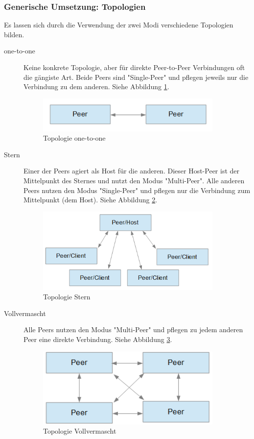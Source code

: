 \subsubsection{Generische Umsetzung: Topologien}
Es lassen sich durch die Verwendung der zwei Modi verschiedene Topologien bilden.
\begin{description}
\item[one-to-one]
Keine konkrete Topologie, aber für direkte Peer-to-Peer Verbindungen oft die gängiste Art. Beide Peers sind "Single-Peer" und pflegen jeweils nur die Verbindung zu dem anderen. 
Siehe Abbildung \ref{backfig3}.
\begin{figure}[ht]
\centering
\includegraphics[width=0.9\textwidth]{backend/Topologie_1v1.PNG}
\caption{Topologie one-to-one}
\label{backfig3}
\end{figure}

\item[Stern]
Einer der Peers agiert als Host für die anderen. Dieser Host-Peer ist der Mittelpunkt des Sternes und nutzt den Modus "Multi-Peer". Alle anderen Peers nutzen den Modus "Single-Peer" und pflegen nur die Verbindung zum Mittelpunkt (dem Host).
Siehe Abbildung \ref{backfig4}.
\begin{figure}[ht]
\centering
\includegraphics[width=0.9\textwidth]{backend/Topologie_4v1.PNG}
\caption{Topologie Stern}
\label{backfig4}
\end{figure}

\item[Vollvermascht]
Alle Peers nutzen den Modus "Multi-Peer" und pflegen zu jedem anderen Peer eine direkte Verbindung.
Siehe Abbildung \ref{backfig5}.
\begin{figure}[ht]
\centering
\includegraphics[width=0.9\textwidth]{backend/Topologie_ava.PNG}
\caption{Topologie Vollvermascht}
\label{backfig5}
\end{figure}


\end{description}
